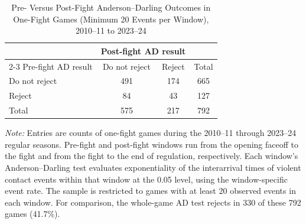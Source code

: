 \begin{table}[htbp]
\centering
\caption{Pre- Versus Post-Fight Anderson--Darling Outcomes in One-Fight Games (Minimum 20 Events per Window), 2010--11 to 2023--24}
\label{tab:one_fight_AD_rejection_min_20_20102011_20232024}
\small
\renewcommand{\arraystretch}{1.15}
\setlength{\tabcolsep}{6pt}

\begin{tabular*}{0.78\textwidth}{@{\extracolsep{\fill}}lccc}
\toprule
 & \multicolumn{2}{c}{Post-fight AD result} & \\
\cmidrule(lr){2-3}
Pre-fight AD result & Do not reject & Reject & Total \\
\midrule
Do not reject & 491 & 174 & 665 \\
Reject & 84 & 43 & 127 \\
\midrule
Total & 575 & 217 & 792 \\
\bottomrule
\end{tabular*}

\vspace{0.4em}
\parbox{0.78\textwidth}{
\footnotesize
\textit{Note:} Entries are counts of one-fight games during the 2010--11 through 2023--24 regular seasons. Pre-fight and post-fight windows run from the opening faceoff to the fight and from the fight to the end of regulation, respectively. Each window's Anderson--Darling test evaluates exponentiality of the interarrival times of violent contact events within that window at the 0.05 level, using the window-specific event rate. The sample is restricted to games with at least 20 observed events in each window. For comparison, the whole-game AD test rejects in 330 of these 792 games (41.7\%).
}
\end{table}
